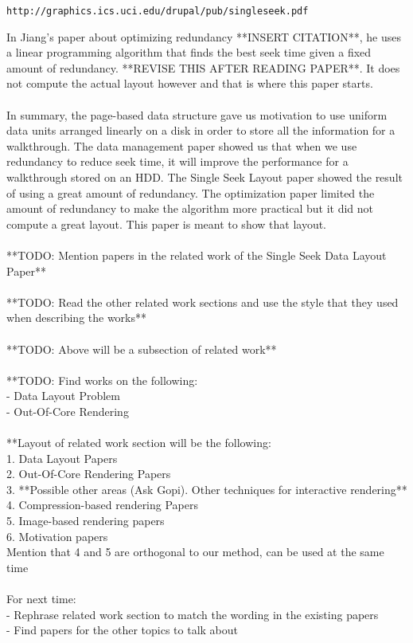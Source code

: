 \documentclass[11pt,psfig]{article}
\begin{document}
\begin{verbatim}
http://graphics.ics.uci.edu/drupal/pub/singleseek.pdf
\end{verbatim}
In Jiang's paper about optimizing redundancy **INSERT CITATION**, he uses a linear programming algorithm that finds the best seek time given a fixed amount of redundancy. **REVISE THIS AFTER READING PAPER**. It does not compute the actual layout however and that is where this paper starts. \\
\\
In summary, the page-based data structure gave us motivation to use uniform data units arranged linearly on a disk in order to store all the information for a walkthrough. The data management paper showed us that when we use redundancy to reduce seek time, it will improve the performance for a walkthrough stored on an HDD. The Single Seek Layout paper showed the result of using a great amount of redundancy. The optimization paper limited the amount of redundancy to make the algorithm more practical but it did not compute a great layout. This paper is meant to show that layout. \\
\\
**TODO: Mention papers in the related work of the Single Seek Data Layout Paper**\\
\\
**TODO: Read the other related work sections and use the style that they used when describing the works**\\
\\
**TODO: Above will be a subsection of related work**\\
\\
**TODO: Find works on the following:\\
- Data Layout Problem\\
- Out-Of-Core Rendering\\
\\
**Layout of related work section will be the following:\\
1. Data Layout Papers\\
2. Out-Of-Core Rendering Papers\\
3. **Possible other areas (Ask Gopi). Other techniques for interactive rendering**\\
4. Compression-based rendering Papers\\
5. Image-based rendering papers\\
6. Motivation papers\\
Mention that 4 and 5 are orthogonal to our method, can be used at the same time\\
\\
For next time:\\
- Rephrase related work section to match the wording in the existing papers\\
- Find papers for the other topics to talk about\\
\end{document}
